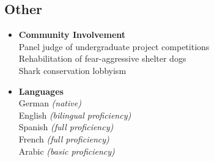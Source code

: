 \documentclass[10pt]{article}
\begin{document}
\begin{flushleft}
\section*{Other}

\begin{itemize}
\item[] \textbf{Community Involvement}\\
Panel judge of undergraduate project competitions \\
Rehabilitation of fear-aggressive shelter dogs \\
Shark conservation lobbyism
\end{itemize}

\begin{itemize}
\item[] \textbf{Languages}\\
German \textit{(native)} \\
English \textit{(bilingual proficiency)} \\
Spanish \textit{(full proficiency)} \\
French \textit{(full proficiency)} \\
Arabic \textit{(basic proficiency)} \\
\end{itemize}



\pagestyle{myheadings}

\end{flushleft}
\end{document}
